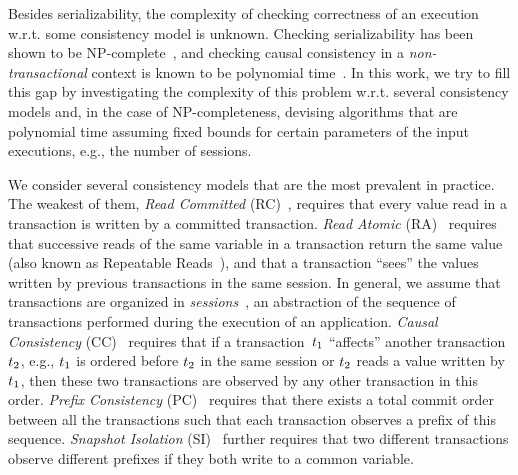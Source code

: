 Besides serializability, the complexity of checking correctness of an execution w.r.t. some consistency model is unknown. Checking serializability has been shown to be NP-complete~\cite{DBLP:journals/jacm/Papadimitriou79b}, and checking causal consistency in a \emph{non-transactional} context is known to be polynomial time~\cite{DBLP:conf/popl/BouajjaniEGH17}. In this work, we try to fill this gap by investigating the complexity of this problem w.r.t. several consistency models and, in the case of NP-completeness, devising algorithms that are polynomial time assuming fixed bounds for certain parameters of the input executions, e.g., the number of sessions. 

%
%
%
%
We consider several consistency models that are the most prevalent in practice. The weakest of them, \emph{Read Committed} (RC)~\cite{DBLP:conf/sigmod/BerensonBGMOO95}, requires that every value read in a transaction is written by a committed transaction. \emph{Read Atomic} (RA)~\cite{DBLP:conf/concur/Cerone0G15} requires that successive reads of the same variable in a transaction return the same value (also known as Repeatable Reads~\cite{DBLP:conf/sigmod/BerensonBGMOO95}), and that a transaction ``sees'' the values written by previous transactions in the same session. In general, we assume that transactions are organized in \emph{sessions}~\cite{DBLP:conf/pdis/TerryDPSTW94}, an abstraction of the sequence of transactions performed during the execution of an application.
\emph{Causal Consistency} (CC)~\cite{DBLP:journals/cacm/Lamport78} requires that if a transaction~${t}_1$ ``affects'' another transaction ${t}_2$, e.g., ${t}_1$ is ordered before ${t}_2$ in the same session or ${t}_2$ reads a value written by ${t}_1$, then these two transactions are observed by any other transaction in this order. \emph{Prefix Consistency} (PC)~\cite{DBLP:conf/ecoop/BurckhardtLPF15} requires that there exists a total commit order between all the transactions such that each transaction observes a prefix of this sequence. \emph{Snapshot Isolation} (SI)~\cite{DBLP:conf/sigmod/BerensonBGMOO95} further requires that two different transactions observe different prefixes if they both write to a common variable.
